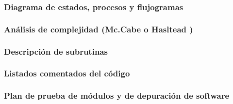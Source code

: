   \subsubsection{Diagrama de estados, procesos y flujogramas}  

  \newpage




  \subsubsection{Análisis de complejidad (Mc.Cabe o Hasltead )}  

  \newpage




  \subsubsection{Descripción de subrutinas}  

  \newpage




  \subsubsection{Listados comentados del código }  

  \newpage



  \subsubsection{Plan de prueba de módulos y de depuración de software}  

  \newpage

%
